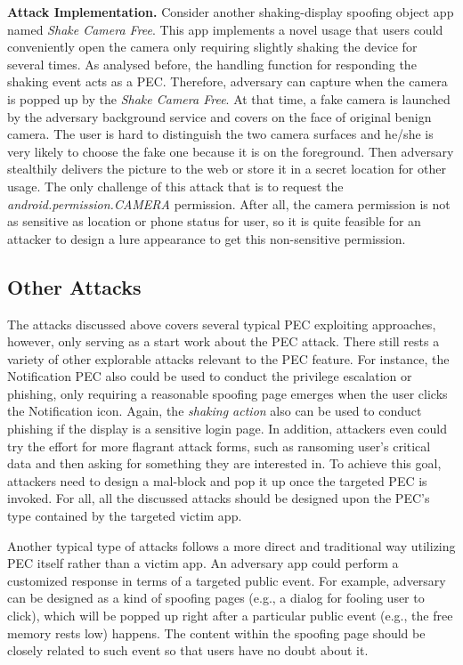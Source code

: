 \textbf{Attack Implementation.}
Consider another shaking-display spoofing object app named \textit{Shake Camera Free}. This app implements a novel usage that users could conveniently open the camera only requiring slightly shaking the device for several times. As analysed before, the handling function for responding the shaking event acts as a PEC. Therefore, adversary can capture when the camera is popped up by the \textit{Shake Camera Free}. At that time, a fake camera is launched by the adversary background service and covers on the face of original benign camera. The user is hard to distinguish the two camera surfaces and he/she is very likely to choose the fake one because it is on the foreground. Then adversary stealthily delivers the picture to the web or store it in a secret location for other usage. The only challenge of this attack that is to request the \textit{android.permission.CAMERA} permission. After all, the camera permission is not as sensitive as location or phone status for user, so it is quite feasible for an attacker to design a lure appearance to get this non-sensitive permission.



\subsection{Other Attacks}
The attacks discussed above covers several typical PEC exploiting approaches, however, only serving as a start work about the PEC attack. There still rests a variety of other explorable attacks relevant to the PEC feature. For instance, the Notification PEC also could be used to conduct the privilege escalation or phishing, only requiring a reasonable spoofing page emerges when the user clicks the Notification icon. Again, the \textit{shaking action} also can be used to conduct phishing if the display is a sensitive login page. In addition, attackers even could try the effort for more flagrant attack forms, such as ransoming user's critical data and then asking for something they are interested in. To achieve this goal, attackers need to design a mal-block and pop it up once the targeted PEC is invoked. For all, all the discussed attacks should be designed upon the PEC's type contained by the targeted victim app.

Another typical type of attacks follows a more direct and traditional way utilizing PEC itself rather than a victim app. An adversary app could perform a customized response in terms of a targeted public event. For example, adversary can be designed as a kind of spoofing pages (e.g., a dialog for fooling user to click), which will be popped up right after a particular public event (e.g., the free memory rests low) happens. The content within the spoofing page should be closely related to such event so that users have no doubt about it. 